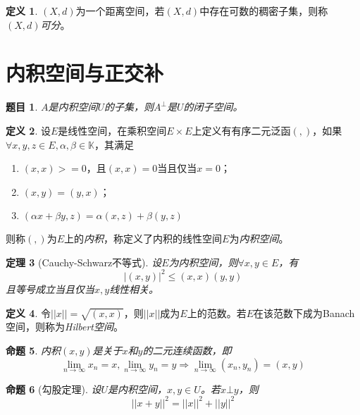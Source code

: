 \documentclass[winfonts,UTF8,c5size,a4paper,fancyhdr,hyperref,titlepage,nocap]{ctexart}
\theoremstyle{question}
\newtheorem{Qut}{题目}
\theoremstyle{theorem}
\newtheorem{thm}{定理}
\newtheorem{prop}[thm]{命题}
\theoremstyle{definition}
\newtheorem{defn}[thm]{定义}
\theoremstyle{remark}
\numberwithin{equation}{subsection}
\newcommand{\K}{\mathbb{K}}
\newcommand{\red}{\color{red}}
\begin{document}
\begin{defn}
  $(X,d)$为一个距离空间，若$(X,d)$中存在可数的稠密子集，则称$(X,d)$\emph{\red 可分}。
\end{defn}

\section{内积空间与正交补}
\begin{Qut}
  $A$是内积空间$U$的子集，则$A^{\bot}$是$U$的闭子空间。
\end{Qut}

\begin{defn}
  设$E$是线性空间，在乘积空间$E\times E$上定义有有序二元泛函$(,)$，如果$\forall x,y,z\in E,\alpha,\beta\in\K$，其满足
\begin{enumerate}[1)]
    \setlength{\itemindent}{2ex}
    \item $(x,x)>=0$，且$(x,x)=0$当且仅当$x=0$；
    \item $(x,y)=(y,x)$；
    \item $(\alpha x+\beta y,z)=\alpha(x,z)+\beta(y,z)$
\end{enumerate}
则称$(,)$为$E$上的\emph{\red 内积}，称定义了内积的线性空间$E$为\emph{\red 内积空间}。
\end{defn}

\begin{thm}[Cauchy-Schwarz不等式]
设$E$为内积空间，则$\forall x,y\in E$，有
\begin{equation*}
|(x,y)|^2\leqslant(x,x)(y,y)
\end{equation*}
且等号成立当且仅当$x,y$线性相关。
\end{thm}

\begin{defn}
  令$||x||=\sqrt{(x,x)}$，则$||x||$成为$E$上的范数。若$E$在该范数下成为Banach空间，则称为\emph{\red Hilbert空间}。
\end{defn}

\begin{prop}
  内积$(x,y)$是关于$x$和$y$的二元连续函数，即
  \begin{equation*}
  \lim_{n\to\infty}x_n=x, \lim_{n\to\infty}y_n=y\Longrightarrow\lim_{n\to\infty}(x_n,y_n)=(x,y)
  \end{equation*}
\end{prop}

\begin{prop}[勾股定理]
  设$U$是内积空间，$x,y\in U$。若$x\bot y$，则
  \begin{equation*}
  ||x+y||^2=||x||^2+||y||^2
  \end{equation*}
\end{prop}
\end{document}
